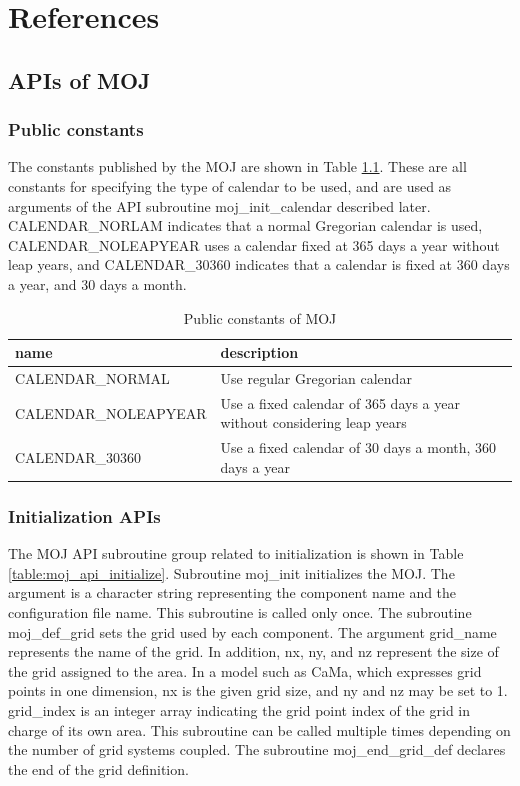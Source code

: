 \documentclass[11pt,a4paper]{report}
\newcommand{\tabref}[1]{Table \ref{#1}}
\begin{document}
\chapter{References}
\section{APIs of MOJ}
\subsection{Public constants}
The constants published by the MOJ are shown in \tabref{table:moj_constant}. 
These are all constants for specifying the type of calendar to be used, and are used as arguments of the API subroutine moj\_init\_calendar described later. 
CALENDAR\_NORLAM indicates that a normal Gregorian calendar is used, CALENDAR\_NOLEAPYEAR uses a calendar fixed at 365 days a year without leap years, and CALENDAR\_30360 indicates that a calendar is fixed at 360 days a year, and 30 days a month.

\begin{table}[H]
\begin{center}
\caption{Public constants of MOJ}
{\small
\label{table:moj_constant}
\begin{tabular}{ll}
\hline\hline
 name & description　\\
\hline
 CALENDAR\_NORMAL & Use regular Gregorian calendar\\
 CALENDAR\_NOLEAPYEAR & Use a fixed calendar of 365 days a year without considering leap years\\
 CALENDAR\_30360 & Use a fixed calendar of 30 days a month, 360 days a year\\
\hline\hline
\end{tabular}
}
\end{center}
\end{table}

\subsection{Initialization APIs}
The MOJ API subroutine group related to initialization is shown in \tabref{table:moj_api_initialize}.
Subroutine moj\_init initializes the MOJ. 
The argument is a character string representing the component name and the configuration file name. This subroutine is called only once.
The subroutine moj\_def\_grid sets the grid used by each component. 
The argument grid\_name represents the name of the grid. 
In addition, nx, ny, and nz represent the size of the grid assigned to the area. 
In a model such as CaMa, which expresses grid points in one dimension, nx is the given grid size, and ny and nz may be set to 1. 
grid\_index is an integer array indicating the grid point index of the grid in charge of its own area. 
This subroutine can be called multiple times depending on the number of grid systems coupled.
The subroutine moj\_end\_grid\_def declares the end of the grid definition.
\end{document}

